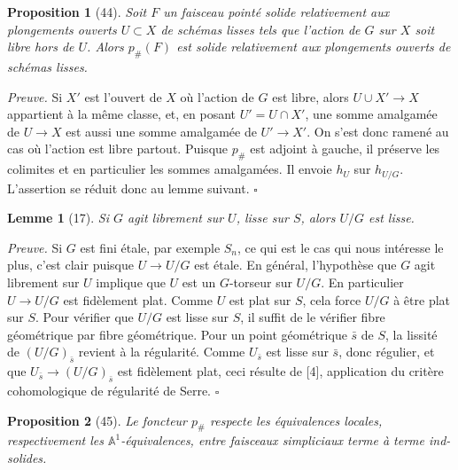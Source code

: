 \documentclass[11pt]{article}
\newcommand{\Aone}{\mathbb A^1}
\theoremstyle{deligne}
\newtheorem*{proposition*}{Proposition}
\newtheorem*{lemma*}{Lemme}
\newenvironment{proofdel}{\noindent\textit{Preuve.}}{\hfill$\square$}
\begin{document}
\begin{proposition*}[44]
Soit \(F\) un faisceau pointé solide relativement aux plongements ouverts \(U\subset X\) de schémas lisses tels que l'action de \(G\) sur \(X\) soit libre hors de \(U\). Alors \(p_\#(F)\) est solide relativement aux plongements ouverts de schémas lisses.
\end{proposition*}

\begin{proofdel}
Si \(X'\) est l'ouvert de \(X\) où l'action de \(G\) est libre, alors \(U\cup X'\to X\) appartient à la même classe, et, en posant \(U'=U\cap X'\), une somme amalgamée de \(U\to X\) est aussi une somme amalgamée de \(U'\to X'\). On s'est donc ramené au cas où l'action est libre partout. Puisque \(p_\#\) est adjoint à gauche, il préserve les colimites et en particulier les sommes amalgamées. Il envoie \(h_U\) sur \(h_{U/G}\). L'assertion se réduit donc au lemme suivant.
\end{proofdel}

\begin{lemma*}[17]
Si \(G\) agit librement sur \(U\), lisse sur \(S\), alors \(U/G\) est lisse.
\end{lemma*}

\begin{proofdel}
Si \(G\) est fini étale, par exemple \(S_n\), ce qui est le cas qui nous intéresse le plus, c'est clair puisque \(U\to U/G\) est étale. En général, l'hypothèse que \(G\) agit librement sur \(U\) implique que \(U\) est un \(G\)-torseur sur \(U/G\). En particulier \(U\to U/G\) est fidèlement plat. Comme \(U\) est plat sur \(S\), cela force \(U/G\) à être plat sur \(S\). Pour vérifier que \(U/G\) est lisse sur \(S\), il suffit de le vérifier fibre géométrique par fibre géométrique. Pour un point géométrique \(\bar s\) de \(S\), la lissité de \((U/G)_{\bar s}\) revient à la régularité. Comme \(U_{\bar s}\) est lisse sur \(\bar s\), donc régulier, et que \(U_{\bar s}\to(U/G)_{\bar s}\) est fidèlement plat, ceci résulte de [4], application du critère cohomologique de régularité de Serre.
\end{proofdel}

\begin{proposition*}[45]
Le foncteur \(p_\#\) respecte les équivalences locales, respectivement les \(\Aone\)-équivalences, entre faisceaux simpliciaux terme à terme ind-solides.
\end{proposition*}
\end{document}

